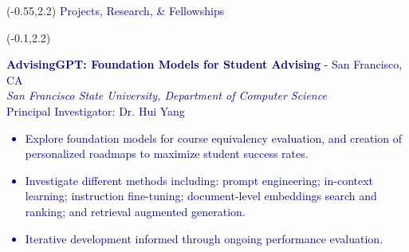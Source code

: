 \documentclass[hidelinks, 10pt]{article}
\newcommand{\bodyspacing}{1mm}
\begin{document}
\begin{textblock}{9.2}(-0.55,2.2)
    \setlength{\parindent}{0cm}
    \large
    \textcolor{navy}{Projects, Research, \& Fellowships}
\end{textblock}

\vspace{-1mm}


\begin{textblock}{8.75}(-0.1,2.2)
    \setlength{\parindent}{0cm}
    \small
    \vspace{5mm}

    \textcolor{navy}{\textbf{AdvisingGPT: Foundation Models for Student
    Advising} - San Francisco, CA\\
        \emph{San Francisco State University, Department of Computer Science}\\
        Principal Investigator: Dr. Hui Yang
        \makeatletter
        \def\@listi{\orig@listi\topsep=0.3\baselineskip}
        \makeatother
        \begin{itemize}[leftmargin=5mm]
            \setlength\itemsep{-0.25em}
            \item Explore foundation models for course equivalency evaluation,
                  and creation of personalized roadmaps to maximize student success rates.
            \item Investigate different methods including: prompt engineering;
                  in-context learning; instruction fine-tuning; document-level
                  embeddings search and ranking; and retrieval augmented generation.
            \item Iterative development informed through ongoing performance
                  evaluation.
        \end{itemize}}

    \vspace{\bodyspacing}


\end{textblock}
\end{document}
